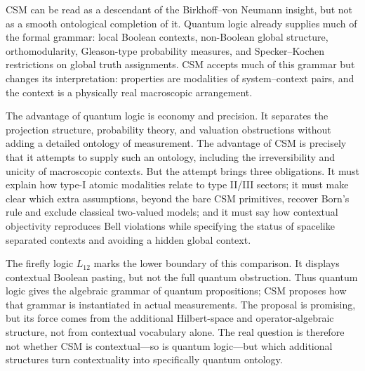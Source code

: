 \documentclass[
aps,
pra,
reprint,
superscriptaddress,
nofootinbib,
longbibliography
]{revtex4-2}
\begin{document}
CSM can be read as a descendant of the Birkhoff--von Neumann insight, but not
as a smooth ontological completion of it.  Quantum logic already supplies much
of the formal grammar: local Boolean contexts, non-Boolean global structure,
orthomodularity, Gleason-type probability measures, and
Specker--Kochen restrictions on global truth assignments.  CSM accepts much
of this grammar but changes its interpretation: properties are modalities of
system--context pairs, and the context is a physically real macroscopic
arrangement.

The advantage of quantum logic is economy and precision.  It separates the
projection structure, probability theory, and valuation obstructions without
adding a detailed ontology of measurement.  The advantage of CSM is precisely
that it attempts to supply such an ontology, including the irreversibility and
unicity of macroscopic contexts.  But the attempt brings three obligations.
It must explain how type-I atomic modalities relate to type II/III sectors;
it must make clear which extra assumptions, beyond the bare CSM primitives,
recover Born's rule and exclude classical two-valued models; and it must say
how contextual objectivity reproduces Bell violations while specifying the
status of spacelike separated contexts and avoiding a hidden global context.

The firefly logic $L_{12}$ marks the lower boundary of this comparison.  It
displays contextual Boolean pasting, but not the full quantum obstruction.
Thus quantum logic gives the algebraic grammar of quantum propositions; CSM
proposes how that grammar is instantiated in actual measurements.  The
proposal is promising, but its force comes from the additional
Hilbert-space and operator-algebraic structure, not from contextual
vocabulary alone.  The real question is therefore not whether CSM is
contextual---so is quantum logic---but which additional structures turn
contextuality into specifically quantum ontology.
\end{document}

